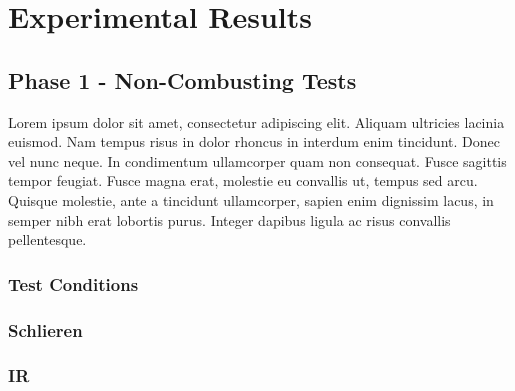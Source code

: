 
\chapter{Experimental Results} %

\label{Chapter5} %



\section{Phase 1 - Non-Combusting Tests}

Lorem ipsum dolor sit amet, consectetur adipiscing elit. Aliquam ultricies lacinia euismod. Nam tempus risus in dolor rhoncus in interdum enim tincidunt. Donec vel nunc neque. In condimentum ullamcorper quam non consequat. Fusce sagittis tempor feugiat. Fusce magna erat, molestie eu convallis ut, tempus sed arcu. Quisque molestie, ante a tincidunt ullamcorper, sapien enim dignissim lacus, in semper nibh erat lobortis purus. Integer dapibus ligula ac risus convallis pellentesque.

\subsection{Test Conditions}




\subsection{Schlieren}


\subsection{IR}

